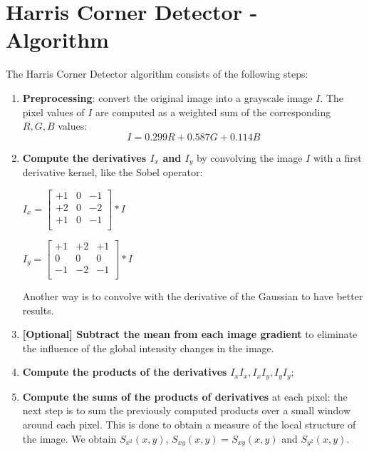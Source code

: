 \documentclass{article}
\begin{document}
\newpage 

\section*{Harris Corner Detector - Algorithm}

The Harris Corner Detector algorithm consists of the following steps:

\begin{enumerate}[start=0]
    \item \textbf{Preprocessing}: convert the original image into a grayscale image $I$. The pixel values of $I$ are computed as a weighted sum of the corresponding $R, G, B$ values:
    \begin{equation*}
        I = 0.299R + 0.587G + 0.114B
    \end{equation*}
    \item \textbf{Compute the derivatives $I_x$ and $I_y$} by convolving the image $I$ with a first derivative kernel, like the Sobel operator:

    \begin{center}
    $I_x = 
    \begin{bmatrix}
    +1 & 0 & -1 \\
    +2 & 0 & -2 \\
    +1 & 0 & -1 \\
    \end{bmatrix} * I$

    $I_y = 
    \begin{bmatrix}
    +1 & +2 & +1 \\
    0 & 0 & 0 \\
    -1 & -2 & -1 \\
    \end{bmatrix} * I$
    \end{center}

    Another way is to convolve with the derivative of the Gaussian to have better results.
    
    \item \textbf{[Optional] Subtract the mean from each image gradient} to eliminate the influence of the global intensity changes in the image.
    
    \item \textbf{Compute the products of the derivatives} $I_xI_x, I_xI_y, I_yI_y$;

    \item \textbf{Compute the sums of the products of derivatives} at each pixel: the next step is to sum the previously computed products over a small window around each pixel. This is done to obtain a measure of the local structure of the image. We obtain $S_{x^2}(x,y)$, $S_{xy}(x,y) = S_{xy}(x,y) $ and $ S_{y^2}(x,y)$.


\end{enumerate}
\end{document}
